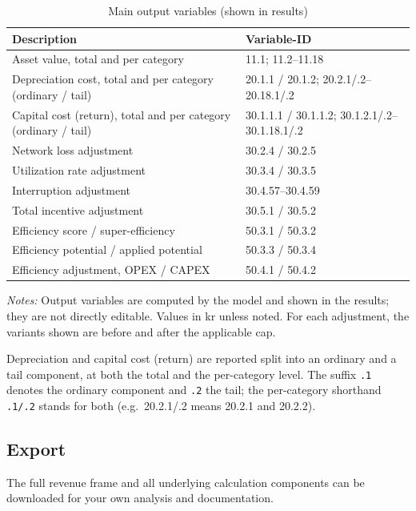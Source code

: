 \begin{table}[H]
\centering
\begin{singlespace}
\footnotesize
\begin{threeparttable}
\caption{Main output variables (shown in results)}
\label{tab:app-var-out}
\begin{tabular}{@{}p{8.5cm}l@{}}
\toprule
\textbf{Description} & \textbf{Variable-ID} \\
\midrule
Asset value, total and per category & 11.1; 11.2--11.18 \\
Depreciation cost, total and per category (ordinary / tail)\tnote{b} & 20.1.1 / 20.1.2; 20.2.1/.2--20.18.1/.2 \\
Capital cost (return), total and per category (ordinary / tail)\tnote{b} & 30.1.1.1 / 30.1.1.2; 30.1.2.1/.2--30.1.18.1/.2 \\
Network loss adjustment & 30.2.4 / 30.2.5 \\
Utilization rate adjustment & 30.3.4 / 30.3.5 \\
Interruption adjustment & 30.4.57--30.4.59 \\
Total incentive adjustment & 30.5.1 / 30.5.2 \\
Efficiency score / super-efficiency & 50.3.1 / 50.3.2 \\
Efficiency potential / applied potential & 50.3.3 / 50.3.4 \\
Efficiency adjustment, OPEX / CAPEX & 50.4.1 / 50.4.2 \\
\bottomrule
\end{tabular}
\begin{tablenotes}
\item \textit{Notes:} Output variables are computed by the model and shown in the results; they are not directly editable. Values in kr unless noted. For each adjustment, the variants shown are before and after the applicable cap.
\item[b] Depreciation and capital cost (return) are reported split into an ordinary and a tail component, at both the total and the per-category level. The suffix \texttt{.1} denotes the ordinary component and \texttt{.2} the tail; the per-category shorthand \texttt{.1/.2} stands for both (e.g.\ 20.2.1/.2 means 20.2.1 and 20.2.2).
\end{tablenotes}
\end{threeparttable}
\end{singlespace}
\end{table}

\subsection{Export}
The full revenue frame and all underlying calculation components can be downloaded for your own analysis and documentation.



